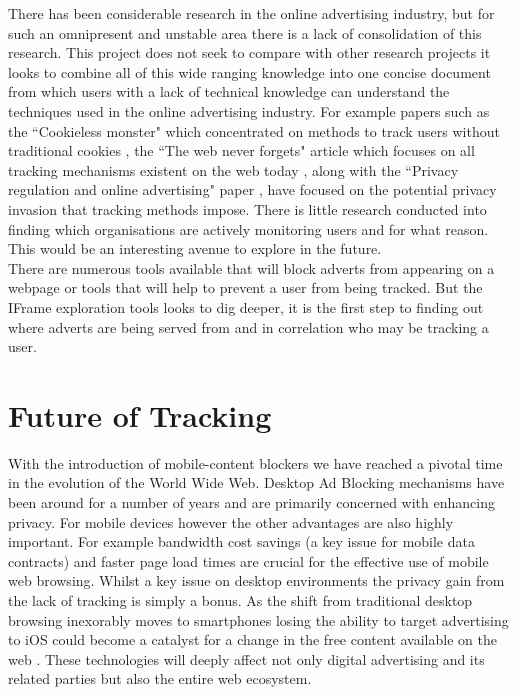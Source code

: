 \documentclass[12pt]{article}
\begin{document}
There has been considerable research in the online advertising industry, but for such an omnipresent and unstable area there is a lack of consolidation of this research. This project does not seek to compare with other research projects it looks to combine all of this wide ranging knowledge into one concise document from which users with a lack of technical knowledge can understand the techniques used in the online advertising industry. For example papers such as the ``Cookieless monster" which concentrated on methods to track users without traditional cookies \parencite{cookielessMonster}, the ``The web never forgets" article which focuses on all tracking mechanisms existent on the web today \parencite{webNeverForgets}, along with the ``Privacy regulation and online advertising" paper \parencite{goldfarb2011privacy}, have focused on the potential privacy invasion that tracking methods impose. There is little research conducted into finding which organisations are actively monitoring users and for what reason. This would be an interesting avenue to explore in the future.  \\

There are numerous tools available that will block adverts from appearing on a webpage or tools that will help to prevent a user from being tracked. But the IFrame exploration tools looks to dig deeper, it is the first step to finding out where adverts are being served from and in correlation who may be tracking a user. 

\pagebreak

\section{Future of Tracking} \label{futureTrack}
With the introduction of mobile-content blockers we have reached a pivotal time in the evolution of the World Wide Web. Desktop Ad Blocking mechanisms have been around for a number of years and are primarily concerned with enhancing privacy. For mobile devices however the other advantages are also highly important. For example bandwidth cost savings (a key issue for mobile data contracts) and faster page load times are crucial for the effective use of mobile web browsing. Whilst a key issue on desktop environments the privacy gain from the lack of tracking is simply a bonus. As the shift from traditional desktop browsing inexorably moves to smartphones losing the ability to target advertising to iOS could become a catalyst for a change in the free content available on the web \parencite{tippingPoint}. These technologies will deeply affect not only digital advertising and its related parties but also the entire web ecosystem. \\
\end{document}
